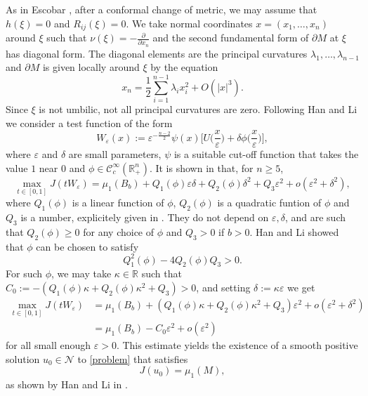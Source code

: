 \documentclass[reqno,11pt,oneside]{amsart}
\numberwithin{equation}{section}
\def\r{\mathbb{R}}
\def\rn{\mathbb{R}^n}
\def\eps{\varepsilon}
\def\cC{\mathcal{C}}
\def\cN{\mathcal{N}}
\begin{document}
As in Escobar \cite[Section 3]{e1}, after a conformal change of metric, we may assume that $h(\xi)=0$ and $R_{ij}(\xi)=0$. We take normal coordinates $x=(x_1,\ldots,x_n)$ around $\xi$ such that $\nu(\xi)=-\frac{\partial}{\partial x_n}$ and the second fundamental form of $\partial M$ at $\xi$ has diagonal form. The diagonal elements are the principal curvatures $\lambda_1,\ldots,\lambda_{n-1}$ and $\partial M$ is given locally around $\xi$ by the equation
$$x_n=\frac{1}{2}\sum_{i=1}^{n-1}\lambda_ix_i^2 + O(|x|^3).$$
Since $\xi$ is not umbilic, not all principal curvatures are zero. Following Han and Li \cite{hl} we consider a test function of the form
\begin{equation*}
W_\eps(x):=\eps^{-\frac{n-2}{2}}\psi(x)\Big[U\Big(\frac{x}{\eps}\Big)+\delta\phi\Big(\frac{x}{\eps}\Big)\Big],
\end{equation*} 
where $\eps$ and $\delta$ are small parameters, $\psi$ is a suitable cut-off function that takes the value $1$ near $0$ and $\phi\in\cC^\infty_c(\rn_+)$. It is shown in \cite{hl} that, for $n\geq 5$, 
\begin{equation*} 
\max_{t\in[0,1]}J(tW_\eps)=\mu_1(B_b)+Q_1(\phi)\eps\delta + Q_2(\phi)\delta^2 + Q_3\eps^2 + o(\eps^2+\delta^2),
\end{equation*}
where $Q_1(\phi)$ is a linear function of $\phi$, $Q_2(\phi)$ is a quadratic funtion of $\phi$ and $Q_3$ is a number, explicitely given in \cite[(2.4), (2.5) and (2.9)]{hl}. They do not depend on $\eps,\delta$, and are such that $Q_2(\phi)\geq 0$ for any choice of $\phi$ and $Q_3>0$ if $b>0$. Han and Li showed that $\phi$ can be chosen to satisfy
$$Q_1^2(\phi)-4Q_2(\phi)Q_3>0.$$
For such $\phi$, we may take $\kappa\in\r$ such that $C_0:=-(Q_1(\phi)\kappa + Q_2(\phi)\kappa^2 + Q_3)>0$, and setting $\delta:=\kappa\eps$ we get
\begin{align} \label{eq:estimate W}
\max_{t\in[0,1]}J(tW_\eps)&=\mu_1(B_b)+(Q_1(\phi)\kappa + Q_2(\phi)\kappa^2 + Q_3)\eps^2 + o(\eps^2+\delta^2)\nonumber\\
&=\mu_1(B_b)-C_0\eps^2+ o(\eps^2)
\end{align}
for all small enough $\eps>0$. This estimate yields the existence of a smooth positive solution $u_0\in\cN$ to \eqref{problem} that satisfies
\begin{equation}\label{eq:J(u_0)}
J(u_0)=\mu_1(M),
\end{equation}
as shown by Han and Li in \cite{hl}.
\end{document}
